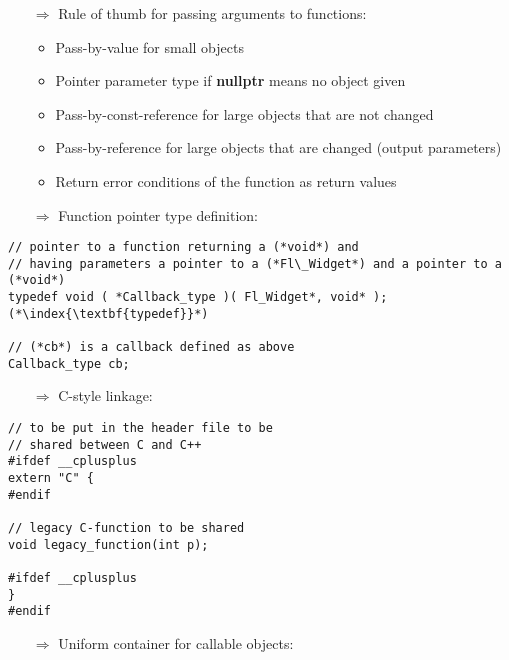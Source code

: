 \documentclass[10pt]{article}
\begin{document}
\begin{enumerate}
\item[$\Rightarrow$] Rule of thumb for passing arguments to functions:
\begin{itemize}
\item Pass-by-value for small objects
\item Pointer parameter type if \textbf{nullptr} means no object given
\item Pass-by-const-reference for large objects that are not changed
\item Pass-by-reference for large objects that are changed (output parameters)
\item Return error conditions of the function as return values
\end{itemize}
\end{enumerate}
\begin{enumerate}
\item[$\Rightarrow$] Function pointer type definition:
\end{enumerate}
\begin{lstlisting}
// pointer to a function returning a (*void*) and
// having parameters a pointer to a (*Fl\_Widget*) and a pointer to a (*void*)
typedef void ( *Callback_type )( Fl_Widget*, void* ); (*\index{\textbf{typedef}}*)

// (*cb*) is a callback defined as above
Callback_type cb;
\end{lstlisting}
\begin{enumerate}
\item[$\Rightarrow$] C-style linkage:
\end{enumerate}
\begin{lstlisting}
// to be put in the header file to be
// shared between C and C++
#ifdef __cplusplus
extern "C" {
#endif

// legacy C-function to be shared
void legacy_function(int p);

#ifdef __cplusplus
}
#endif
\end{lstlisting}
\begin{enumerate}
\item[$\Rightarrow$] Uniform container for callable objects:
\end{enumerate}
\end{document}
